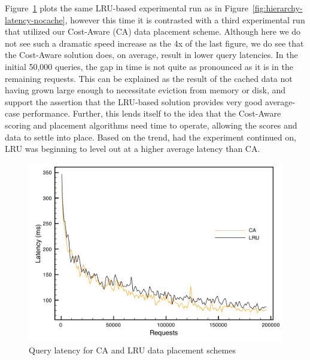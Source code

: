 Figure~\ref{fig:hierarchy-latency} plots the same LRU-based experimental run as
in Figure~\ref{fig:hierarchy-latency-nocache}, however this time it is
contrasted with a third experimental run that utilized our Cost-Aware (CA)
data placement scheme. Although here we do not see such a dramatic speed
increase as the 4x of the last figure, we do see that the Cost-Aware solution
does, on average, result in lower query latencies. In the initial 50,000
queries, the gap in time is not quite as pronounced as it is in the remaining
requests. This can be explained as the result of the cached data not having
grown large enough to necessitate eviction from memory or disk, and support the
assertion that the LRU-based solution provides very good average-case
performance. Further, this lends itself to the idea that the Cost-Aware scoring
and placement algorithms need time to operate, allowing the scores and data to
settle into place. Based on the trend, had the experiment continued on, LRU was
beginning to level out at a higher average latency than CA.

\begin{figure}
\begin{center}
\includegraphics[scale=0.5]{figures/hierarchy-latency.pdf}
\end{center}
\caption{Query latency for CA and LRU data placement schemes}
\label{fig:hierarchy-latency}
\end{figure}

